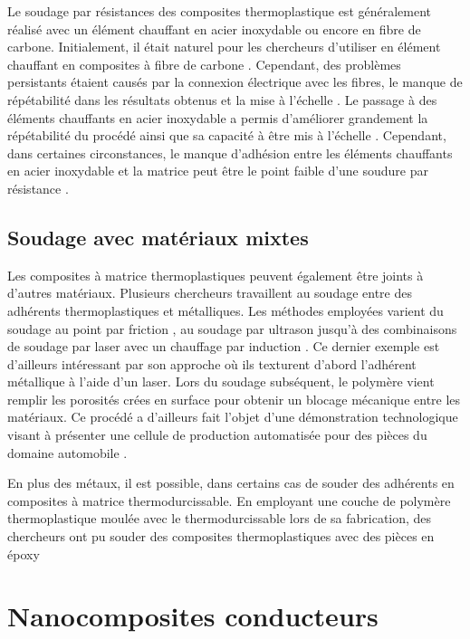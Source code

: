 Le soudage par résistances des composites thermoplastique est généralement réalisé avec un élément chauffant en acier inoxydable ou encore en fibre de carbone. 
Initialement, il était naturel pour les chercheurs d'utiliser en élément chauffant en composites à fibre de carbone \cite{Ageorges2000a,houghton1984bonding,Eveno1988}. 
Cependant, des problèmes persistants étaient causés par la connexion électrique avec les fibres, le manque de répétabilité dans les résultats obtenus et la mise à l'échelle \cite{McKnight1997}. 
Le passage à des éléments chauffants en acier inoxydable a permis d'améliorer grandement la répétabilité du procédé ainsi que sa capacité à être mis à l'échelle \cite{Hou1999a}.  
Cependant, dans certaines circonstances, le manque d'adhésion entre les éléments chauffants en acier inoxydable et la matrice peut être le point faible d'une soudure par résistance \cite{Dube2007,Dube2012a,Dube2009a,Shi2014,Shi2015a}. 

\subsection{Soudage avec matériaux mixtes}

Les composites à matrice thermoplastiques peuvent également être joints à d'autres matériaux. 
Plusieurs chercheurs travaillent au soudage entre des adhérents thermoplastiques et métalliques. 
Les méthodes employées varient du soudage au point par friction \cite{Goushegir2016}, au soudage par ultrason \cite{Balle2009,Kruger2004} jusqu'à des combinaisons de soudage par laser avec un chauffage par induction \cite{Weidmann2018}. 
Ce dernier exemple est d'ailleurs intéressant par son approche où ils texturent d'abord l'adhérent métallique à l'aide d'un laser. 
Lors du soudage subséquent, le polymère vient remplir les porosités crées en surface pour obtenir un blocage mécanique entre les matériaux. 
Ce procédé a d'ailleurs fait l'objet d'une démonstration technologique visant à présenter une cellule de production automatisée pour des pièces du domaine automobile \cite{Gardiner2019a}. 

En plus des métaux, il est possible, dans certains cas de souder des adhérents en composites à matrice thermodurcissable. 
En employant une couche de polymère thermoplastique moulée avec le thermodurcissable lors de sa fabrication, des chercheurs ont pu souder des composites thermoplastiques avec des pièces en époxy \cite{Lionetto2018a,FernandezVillegas2015}

\section{Nanocomposites conducteurs}

